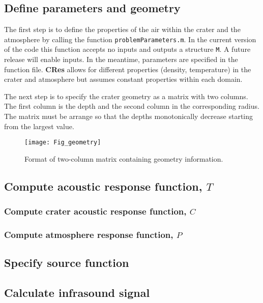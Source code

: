 \documentclass[10pt]{article}
\begin{document}
\subsection{Define parameters and geometry}

The first step is to define the properties of the air within the crater and the atmosphere by calling the function \texttt{problemParameters.m}. In the current version of the code this function accepts no inputs and outputs a structure \texttt{M}. A future release will enable inputs. In the meantime, parameters are specified in the function file. {\bf CRes} allows for different properties (density, temperature) in the crater and atmosphere  but assumes constant properties within each domain.

The next step is to specify the crater geometry as a matrix with two columns. The first column is the depth and the second column in the corresponding radius. The matrix must be arrange so that the depths monotonically decrease starting from the largest value.
\begin{figure}[h!]
\centering
\texttt{[image: Fig\_geometry]}
\caption{Format of two-column matrix containing geometry information.}
\end{figure}

\subsection{Compute acoustic response function, $T$}

\subsubsection{Compute crater acoustic response function, $C$}

\subsubsection{Compute atmosphere response function, $P$}

\subsection{Specify source function}

\subsection{Calculate infrasound signal}
\end{document}

